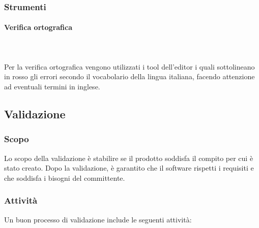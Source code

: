 	\subsubsection{Strumenti}
		\paragraph{Verifica ortografica} \mbox{}\\ \mbox{}\\
		Per la verifica ortografica vengono utilizzati i tool dell'editor i quali sottolineano in rosso gli errori secondo il vocabolario della lingua italiana, facendo attenzione ad eventuali termini in inglese.
	
\subsection{Validazione}
	\subsubsection{Scopo}
	Lo scopo della validazione è stabilire se il prodotto soddisfa il compito per cui è stato creato. Dopo la validazione, è garantito che il software rispetti i requisiti e che soddisfa i bisogni del committente.

	\subsubsection{Attività}
	Un buon processo di validazione include le seguenti attività:
